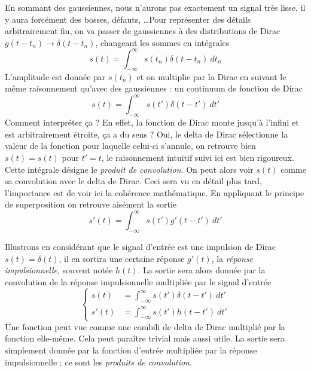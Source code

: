 En sommant des gaussiennes, nous n'aurons pas exactement un signal très lisse, il y aura forcément 
des bosses, défauts, \dots Pour représenter des détails arbitrairement fin, on va passer de 
gaussiennes à des distributions de Dirac $g(t-t_n) \rightarrow \delta(t-t_n)$, changeant les 
sommes en intégrales
\begin{equation}
s(t) = \int_{-\infty}^\infty s(t_n)\delta(t-t_n)\ dt_n
\end{equation}
L'amplitude est donnée par $s(t_n)$ et on multiplie par la Dirac en suivant le même raisonnement 
qu'avec des gaussiennes : un continuum de fonction de Dirac
\begin{equation}
s(t) = \int_{-\infty}^\infty s(t')\delta(t-t')\ dt'
\end{equation}
Comment interpréter ça ? En effet, la fonction de Dirac monte jusqu'à l'infini et est arbitrairement 
étroite, ça a du sens ? Oui, le delta de Dirac sélectionne la valeur de la fonction pour laquelle 
celui-ci s'annule, on retrouve bien $s(t)=s(t)$ pour $t'=t$, le raisonnement intuitif suivi ici est bien 
rigoureux. Cette intégrale désigne le \textit{produit de convolution}. On peut alors voir $s(t)$ 
comme sa convolution avec le delta de Dirac. Ceci sera vu en détail plus tard, l'importance est 
de voir ici la cohérence mathématique. En appliquant le principe de superposition on retrouve 
aisément la sortie
\begin{equation}
s'(t) = \int_{-\infty}^\infty s(t')g'(t-t')\ dt'
\end{equation}

Illustrons en considérant que le signal d'entrée est une impulsion de Dirac $s(t) = \delta(t)$, 
il en sortira une certaine réponse $g'(t)$, la \textit{réponse impulsionnelle}, souvent notée $h(t)$. 
La sortie sera alors donnée par la convolution de la réponse impulsionnelle multipliée par le signal 
d'entrée
\begin{equation}
\left\{\begin{array}{ll}
s(t) &= \int_{-\infty}^\infty s(t')\delta(t-t')\ dt'\\
s'(t) &= \int_{-\infty}^\infty s(t')h(t-t')\ dt'
\end{array}\right.
\end{equation}
Une fonction peut vue comme une combili de delta de Dirac multiplié par la fonction elle-même. Cela 
peut paraître trivial mais aussi utile. La sortie sera simplement donnée par la fonction d'entrée 
multipliée par la réponse impulsionnelle ; ce sont les \textit{produits de convolution}.\\

